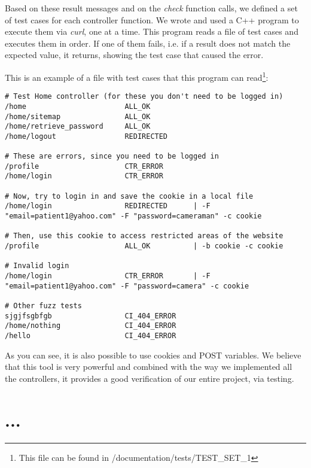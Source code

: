 Based on these result messages and on the \emph{check} function calls, we defined a set of test cases for each controller function. We wrote and used a C++ program to execute them via \emph{curl}, one at a time. This program reads a file of test cases and executes them in order. If one of them fails, i.e. if a result does not match the expected value, it returns, showing the test case that caused the error.

This is an example of a file with test cases that this program can read\footnote{This file can be found in /documentation/tests/TEST\_SET\_1}:
\begin{verbatim}
# Test Home controller (for these you don't need to be logged in)
/home						ALL_OK
/home/sitemap				ALL_OK
/home/retrieve_password		ALL_OK
/home/logout				REDIRECTED

# These are errors, since you need to be logged in
/profile					CTR_ERROR
/home/login					CTR_ERROR

# Now, try to login in and save the cookie in a local file
/home/login					REDIRECTED		| -F "email=patient1@yahoo.com" -F "password=cameraman" -c cookie

# Then, use this cookie to access restricted areas of the website
/profile					ALL_OK			| -b cookie -c cookie

# Invalid login
/home/login					CTR_ERROR		| -F "email=patient1@yahoo.com" -F "password=camera" -c cookie

# Other fuzz tests
sjgjfsgbfgb					CI_404_ERROR
/home/nothing				CI_404_ERROR
/hello						CI_404_ERROR
\end{verbatim}
As you can see, it is also possible to use cookies and POST variables. We believe that this tool is very powerful and combined with the way we implemented all the controllers, it provides a good verification of our entire project, via testing.







\section{...}

